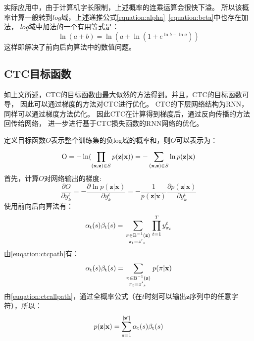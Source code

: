 实际应用中，由于计算机字长限制，上述概率的连乘运算会很快下溢。
所以该概率计算一般转到$log$域，上述递推公式\ref{equation:alpha}~\ref{equation:beta}中也存在加法，
$log$域中加法的一个有用等式是：
\begin{equation}
\ln (a + b) = \ln (a + \ln (1 + {e^{\ln b - \ln a}}))
\end{equation}
这样即解决了前向后向算法中的数值问题。

\subsection{CTC目标函数}

如上文所述，CTC的目标函数由最大似然的方法得到。并且，CTC的目标函数可导，
因此可以通过梯度的方法对CTC进行优化。
CTC的下层网络结构为RNN，同样可以通过梯度方法优化。
因此CTC在计算得到梯度后，通过反向传播的方法回传给网络，
进一步进行基于CTC损失函数的RNN网络的优化。

定义目标函数$O$表示整个训练集的负log域的概率和，则$O$可以表示为：
\begin{equation}
{\rm{O}} =  - \ln (\prod\limits_{({\textbf{x}},{\textbf{z}}) \in S} {p({\textbf{z}}|{\textbf{x}})} ) =  - \sum\limits_{({\textbf{x}},{\textbf{z}}) \in S}^{} {\ln p({\textbf{z}}|{\textbf{x}})}
\end{equation}
首先，计算$O$对网络输出的梯度:
\begin{equation}
\label{equation:o}
\frac{{\partial O}}{{\partial y_k^t}} =  - \frac{{\partial \ln p({\textbf{z}}|{\textbf{x}})}}{{\partial y_k^t}} =  - \frac{1}{{p({\textbf{z}}|{\textbf{x}})}}\frac{{\partial p({\textbf{z}}|{\textbf{x}})}}{{\partial y_k^t}}
\end{equation}
使用前向后向算法有：
\begin{equation}
{\alpha _{\rm{t}}}(s){\beta _{\rm{t}}}(s) = \sum\limits_{\scriptstyle\pi  \in {{\rm B}^{ - 1}}({\textbf{z}})\hfill\atop
\scriptstyle{\kern 1pt} {\kern 1pt} {\kern 1pt} {\kern 1pt} {\pi _t} = {{z'}_s}\hfill} {\prod\limits_{t = 1}^T {y_{{\pi _t}}^t} }
\end{equation}
由\ref{euqation:ctcpath}有：
\begin{equation}
{\alpha _{\rm{t}}}(s){\beta _{\rm{t}}}(s) = \sum\limits_{\scriptstyle\pi  \in {{\rm B}^{ - 1}}({\textbf{z}})\hfill\atop
\scriptstyle{\kern 1pt} {\kern 1pt} {\kern 1pt} {\kern 1pt} {\pi _t} = {{z'}_s}\hfill} {p(} \pi |{\textbf{x}})
\end{equation}
由\ref{euqation:ctcallpath}，通过全概率公式（在$t$时刻可以输出${\textbf{z}}$序列中的任意字符），所以：
\begin{equation}
\label{equation:alls}
p({\textbf{z}}|{\textbf{x}}) = \sum\limits_{s = 1}^{|{\textbf{z'}}|} {{\alpha _{\rm{t}}}(s){\beta _{\rm{t}}}(s)}
\end{equation}

